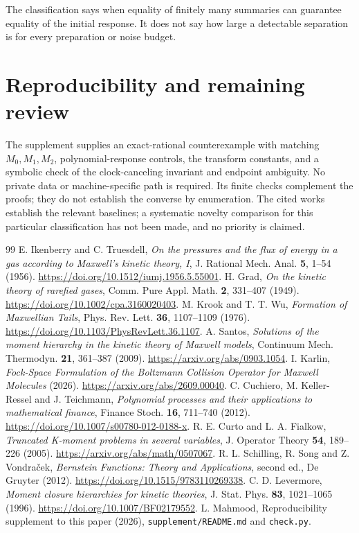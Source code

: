 \documentclass[11pt]{article}
\begin{document}
The classification says when equality of finitely many summaries can
guarantee equality of the initial response. It does not say how large a
detectable separation is for every preparation or noise budget.

\section{Reproducibility and remaining review}
The supplement supplies an exact-rational counterexample with matching
$M_0,M_1,M_2$, polynomial-response controls, the transform constants,
and a symbolic check of the clock-canceling invariant and endpoint
ambiguity. No private data or machine-specific path is required.
Its finite checks complement the proofs; they do not establish the
converse by enumeration. The cited works establish the relevant baselines;
a systematic novelty comparison for this particular classification has
not been made, and no priority is claimed.

\aistatement
\begin{thebibliography}{99}
 E. Ikenberry and C. Truesdell,
\emph{On the pressures and the flux of energy in a gas according to
Maxwell's kinetic theory, I}, J. Rational Mech. Anal. \textbf{5}, 1--54 (1956).
\url{https://doi.org/10.1512/iumj.1956.5.55001}.
 H. Grad,
\emph{On the kinetic theory of rarefied gases},
Comm. Pure Appl. Math. \textbf{2}, 331--407 (1949).
\url{https://doi.org/10.1002/cpa.3160020403}.
 M. Krook and T. T. Wu,
\emph{Formation of Maxwellian Tails},
Phys. Rev. Lett. \textbf{36}, 1107--1109 (1976).
\url{https://doi.org/10.1103/PhysRevLett.36.1107}.
 A. Santos,
\emph{Solutions of the moment hierarchy in the kinetic theory of Maxwell models},
Continuum Mech. Thermodyn. \textbf{21}, 361--387 (2009).
\url{https://arxiv.org/abs/0903.1054}.
 I. Karlin,
\emph{Fock-Space Formulation of the Boltzmann Collision Operator for Maxwell
Molecules} (2026). \url{https://arxiv.org/abs/2609.00040}.
 C. Cuchiero, M. Keller-Ressel and J. Teichmann,
\emph{Polynomial processes and their applications to mathematical finance},
Finance Stoch. \textbf{16}, 711--740 (2012).
\url{https://doi.org/10.1007/s00780-012-0188-x}.
 R. E. Curto and L. A. Fialkow,
\emph{Truncated K-moment problems in several variables},
J. Operator Theory \textbf{54}, 189--226 (2005).
\url{https://arxiv.org/abs/math/0507067}.
 R. L. Schilling, R. Song and Z. Vondra\v{c}ek,
\emph{Bernstein Functions: Theory and Applications}, second ed.,
De Gruyter (2012). \url{https://doi.org/10.1515/9783110269338}.
 C. D. Levermore,
\emph{Moment closure hierarchies for kinetic theories},
J. Stat. Phys. \textbf{83}, 1021--1065 (1996).
\url{https://doi.org/10.1007/BF02179552}.
 L. Mahmood, Reproducibility supplement to this paper (2026),
\texttt{supplement/README.md} and \texttt{check.py}.
\end{thebibliography}
\end{document}
